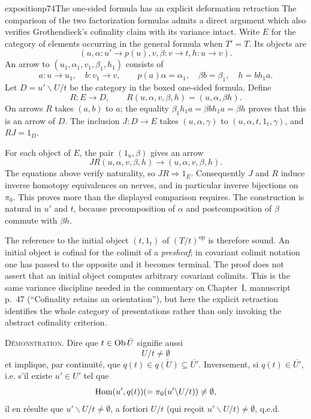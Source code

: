 \begin{dcomment}{exposition}{p74}{The one-sided formula has an explicit deformation retraction}
The comparison of the two factorization formulas admits a direct argument which also verifies Grothendieck's cofinality claim with its variance intact. Write $E$ for the category of elements occurring in the general formula when $T'=T$. Its objects are
\[
 (u,\alpha:u'\to p(u),v,\beta:v\to t,h:u\to v).
\]
An arrow to $(u_1,\alpha_1,v_1,\beta_1,h_1)$ consists of
\[
 a:u\to u_1,\quad b:v_1\to v,\qquad
 p(a)\alpha=\alpha_1,\quad \beta b=\beta_1,\quad
 h=b h_1a.
\]
Let $D=u'\backslash U/t$ be the category in the boxed one-sided formula. Define
\[
 R:E\longrightarrow D,\qquad
 R(u,\alpha,v,\beta,h)=(u,\alpha,\beta h).
\]
On arrows $R$ takes $(a,b)$ to $a$; the equality
$\beta_1h_1a=\beta b h_1a=\beta h$ proves that this is an arrow of $D$. The inclusion $J:D\to E$ takes $(u,\alpha,\gamma)$ to $(u,\alpha,t,1_t,\gamma)$, and $RJ=1_D$.

For each object of $E$, the pair $(1_u,\beta)$ gives an arrow
\[
 JR(u,\alpha,v,\beta,h)
       \longrightarrow(u,\alpha,v,\beta,h).
\]
The equations above verify naturality, so $JR\Rightarrow1_E$. Consequently $J$ and $R$ induce inverse homotopy equivalences on nerves, and in particular inverse bijections on $\pi_0$. This proves more than the displayed comparison requires. The construction is natural in $u'$ and $t$, because precomposition of $\alpha$ and postcomposition of $\beta$ commute with $\beta h$.

The reference to the initial object $(t,1_t)$ of $(T/t)^{\mathrm{op}}$ is therefore sound. An initial object is cofinal for the colimit of a \emph{presheaf}; in covariant colimit notation one has passed to the opposite and it becomes terminal. The proof does not assert that an initial object computes arbitrary covariant colimits. This is the same variance discipline needed in the commentary on Chapter~I, manuscript p.~47 (``Cofinality retains an orientation''), but here the explicit retraction identifies the whole category of presentations rather than only invoking the abstract cofinality criterion.
\end{dcomment}


\textsc{Démonstration}. Dire que $t\in\mathrm{Ob}\,\bar{U}$ signifie aussi
\[
U/t\neq\emptyset
\]
et implique, par continuité, que $q(t)\in\overline{q(U)}\subseteq\overline{U'}$. Inversement, si $q(t)\in\overline{U'}$, i.e. s'il existe $u'\in U'$ tel que
\[
\mathrm{Hom}(u',q(t))(=\pi_0(u'\backslash U/t))\neq\emptyset,
\]
il en résulte que $u'\backslash U/t\neq\emptyset$, a fortiori $U/t$ (qui reçoit $u'\backslash U/t)\neq\emptyset$, q.e.d.

